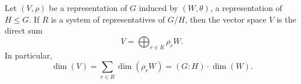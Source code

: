 Let $(V, \rho)$ be a representation of $G$ induced by $(W, \theta)$, a representation of $H \leq G$. If $R$ is a system of representatives of $G/H$, then the vector space $V$ is the direct sum
$$V = \bigoplus_{r \in R} \rho_r W.$$
In particular,
$$\dim(V) = \sum_{r \in R} \dim(\rho_r W) = (G:H) \cdot \dim(W).$$
